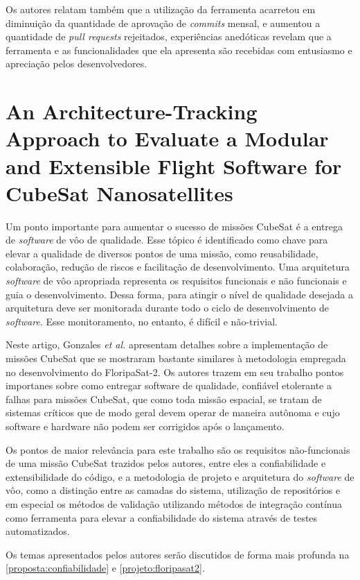 Os autores relatam também que a utilização da ferramenta acarretou em diminuição da quantidade de aprovação de \textit{commits} mensal, e aumentou a quantidade de \textit{pull requests} rejeitados, experiências anedóticas revelam que a ferramenta e as funcionalidades que ela apresenta são recebidas com entusiasmo e apreciação pelos desenvolvedores.


\section{An Architecture-Tracking Approach to Evaluate
a Modular and Extensible Flight Software
for CubeSat Nanosatellites \texorpdfstring{\cite{gonzales-2019}}{}}
\label{relacionados:gonzales-2019}
Um ponto importante para aumentar o sucesso de missões CubeSat é a entrega de \textit{software} de vôo de qualidade. Esse tópico é identificado como chave para elevar a qualidade de diversos pontos de uma missão, como reusabilidade, colaboração, redução de riscos e facilitação de desenvolvimento. Uma arquitetura \textit{software} de vôo apropriada representa  os requisitos funcionais e não funcionais e guia o desenvolvimento. Dessa forma, para atingir o nível de qualidade desejada a arquitetura deve ser monitorada durante todo o ciclo de desenvolvimento de \textit{software}. Esse monitoramento, no entanto, é difícil e não-trivial.

Neste artigo, Gonzales \textit{et al.} apresentam detalhes sobre a implementação de missões CubeSat que se mostraram bastante similares à metodologia empregada no desenvolvimento do FloripaSat-2. Os autores trazem em seu trabalho pontos importanes sobre como entregar software de qualidade, confiável etolerante a falhas para missões CubeSat, que como toda missão espacial, se tratam de sistemas críticos que de modo geral devem operar de maneira autônoma e cujo software e hardware não podem ser corrigidos após o lançamento.

Os pontos de maior relevância para este trabalho são os requisitos não-funcionais de uma missão CubeSat trazidos pelos autores, entre eles a confiabilidade e extensibilidade do código, e a metodologia de projeto e arquitetura do \textit{software} de vôo, como a distinção entre as camadas do sistema, utilização de repositórios e em especial os métodos de validação utilizando métodos de integração contínua como ferramenta para elevar a confiabilidade do sistema através de testes automatizados.

Os temas apresentados pelos autores serão discutidos de forma mais profunda na \autoref{proposta:confiabilidade} e \autoref{projeto:floripasat2}.

